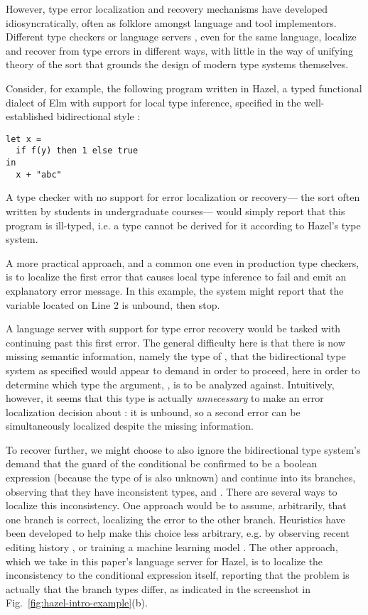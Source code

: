 However, type error localization and recovery mechanisms have developed idiosyncratically, 
often as folklore amongst language and tool implementors. 
Different type checkers or language servers \cite{langauge-servers,merlin}, even for the same language, localize and recover from type errors in different ways, 
with little in the way of unifying theory of the sort that grounds the design of modern type systems themselves.

Consider, for example, the following program written in Hazel, a typed functional dialect of Elm \cite{elm} with 
support for local type inference, specified in the well-established bidirectional style \cite{pierce,hazelnut,BidirTyping}: 
\begin{lstlisting}[numbers=none]
let x = 
  if f(y) then 1 else true
in 
  x + "abc"
\end{lstlisting}
A type checker with no support for error localization or recovery---%
the sort often written by students in undergraduate courses---%
would simply report that this program is ill-typed, 
i.e. a type cannot be derived for it according to Hazel's type system. 

A more practical approach, and a common one even in production type checkers, 
is to localize the first error that causes local type inference to fail and emit an explanatory error message.
In this example, the system might report that the variable  located on Line 2 is unbound, then stop.

A language server with support for type error recovery would 
 be tasked with continuing past this first error.
 The general difficulty here is that there is now missing semantic information, namely the type of , that 
 the bidirectional type system as specified 
 would appear to demand in order to proceed, here in order to determine which type the argument, , is to be analyzed against.
 Intuitively, however, it seems that this type is actually \emph{unnecessary} to make an error localization decision about : 
it is unbound, so a second error can be simultaneously localized despite the missing information.

To recover further, we might choose to also ignore the bidirectional type system's demand that the guard of the conditional be confirmed to be a boolean expression 
(because the type of  is also unknown) 
and continue into its branches, observing that they have inconsistent types,  and . 
There are several ways to localize this inconsistency. 
One approach would be to assume, arbitrarily, that one branch is correct, localizing the error to the other branch. 
Heuristics have been developed to help make this choice less arbitrary, e.g. 
by observing recent editing history , 
or training a machine learning model . 
The other approach, which we take in this paper's language server for Hazel, is to localize the inconsistency to the conditional expression itself, reporting that the problem is actually that the branch types differ, as indicated in
the screenshot in Fig.~\ref{fig:hazel-intro-example}(b).

